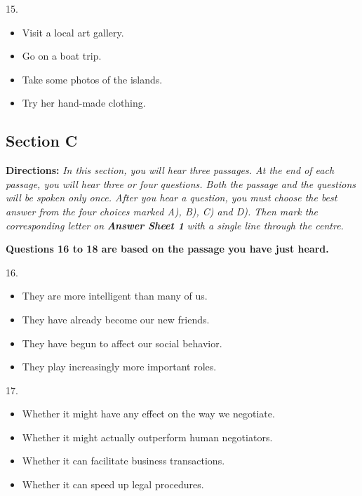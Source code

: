 \documentclass[UTF8,11pt]{ctexart}
\begin{document}
15.


\begin{itemize}[leftmargin=2em,itemsep=.2em,topsep=.4em]\item[A.] Visit a local art gallery.
\item[B.] Go on a boat trip.
\item[C.] Take some photos of the islands.
\item[D.] Try her hand-made clothing.
\end{itemize}

\subsection*{\textbf{Section C}}


\textbf{Directions:}\textit{ In this section, you will hear three passages. At the end of each passage, you will hear three or four} \textit{questions. Both the passage and the questions will be spoken only once. After you hear a question, you must} \textit{choose the best answer from the four choices marked A), B), C) and D). Then mark the corresponding letter on} \textbf{\textit{Answer Sheet 1}}\textit{ with a single line through the centre.}


\textbf{Questions 16 to 18 are based on the passage you have just heard.}


16.


\begin{itemize}[leftmargin=2em,itemsep=.2em,topsep=.4em]\item[A.] They are more intelligent than many of us.
\item[B.] They have already become our new friends.
\item[C.] They have begun to affect our social behavior.
\item[D.] They play increasingly more important roles.
\end{itemize}

17.


\begin{itemize}[leftmargin=2em,itemsep=.2em,topsep=.4em]\item[A.] Whether it might have any effect on the way we negotiate.
\item[B.] Whether it might actually outperform human negotiators.
\item[C.] Whether it can facilitate business transactions.
\item[D.] Whether it can speed up legal procedures.
\end{itemize}
\end{document}
